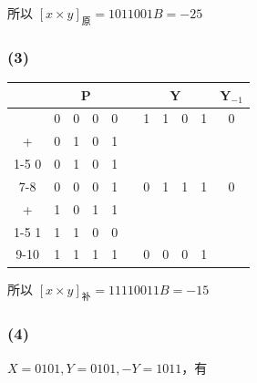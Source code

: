\documentclass[12pt, a4paper]{ctexart}
\begin{document}
所以 $\left[x\times y\right]_\text{原}=1011001B=-25$

\subsubsection*{(3)}

\begin{table}[H]
    \centering
    \begin{tabular}{ccccccccccc}
        \hline
        & \multicolumn{4}{c}{P} && \multicolumn{4}{c}{Y} & Y$_{-1}$ \\
        \hline
          & 0&0&0&0 &\multicolumn{1}{c|}{}& 1&1&0&1 & 0 \\ \hdashline
        + & 0&1&0&1 &\multicolumn{1}{c|}{}              \\ \cline{1-5}
        0 & 0&1&0&1 &\multicolumn{1}{c|}{}              \\ \cline{7-8}
          & 0&0&0&1 && 0&\multicolumn{1}{c|}{1}&1&1 & 0 \\ \hdashline
        + & 1&0&1&1 && &\multicolumn{1}{c|}{}           \\ \cline{1-5}
        1 & 1&1&0&0 && &\multicolumn{1}{c|}{}           \\ \cline{9-10}
          & 1&1&1&1 && 0&0&0&\multicolumn{1}{c|}{1}     \\ \hline
    \end{tabular}
\end{table}

所以 $\left[x\times y\right]_\text{补}=11110011B=-15$

\subsubsection*{(4)}

$X=0101,Y=0101,-Y=1011$，有
\end{document}
